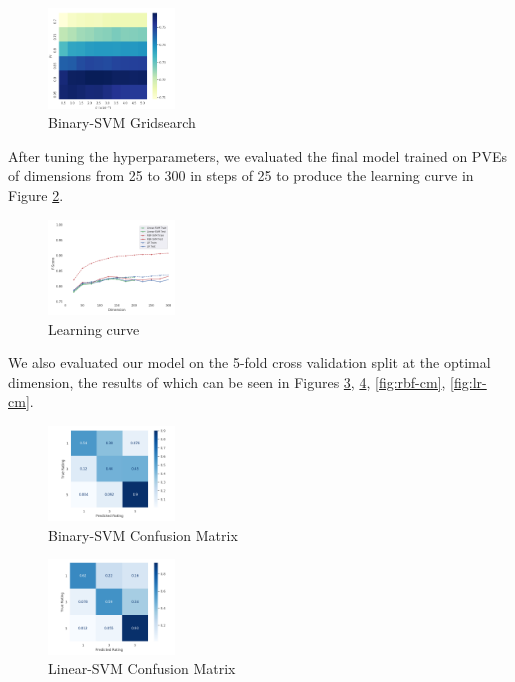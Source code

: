 \documentclass[11pt]{article}
\begin{document}
\begin{figure}
	\centering
	\includegraphics[width = 0.3\textwidth]{fig-binary-gridsearch.png}
	\caption{Binary-SVM Gridsearch}
	\label{fig:binary-gridsearch}
\end{figure}

After tuning the hyperparameters, we evaluated the final model trained on PVEs of dimensions from 25 to 300 in steps of 25 to produce the learning curve in Figure \ref{fig:learning-curve}. 
\begin{figure}
	\centering
	\includegraphics[width = 0.3\textwidth]{learning-curves.png}
	\caption{Learning curve}
	\label{fig:learning-curve}
\end{figure}

We also evaluated our model on the 5-fold cross validation split at the optimal dimension, the results of which can be seen in Figures \ref{fig:binary-cm}, \ref{fig:linear-cm}, \ref{fig:rbf-cm}, \ref{fig:lr-cm}. 
\begin{figure}
	\centering
	\includegraphics[width = 0.3\textwidth]{fig-binary-cm.png}
	\caption{Binary-SVM Confusion Matrix}
	\label{fig:binary-cm}
\end{figure}

\begin{figure}
	\centering
	\includegraphics[width = 0.3\textwidth]{fig-linear-cm.png}
	\caption{Linear-SVM Confusion Matrix}
	\label{fig:linear-cm}
\end{figure}
\end{document}
